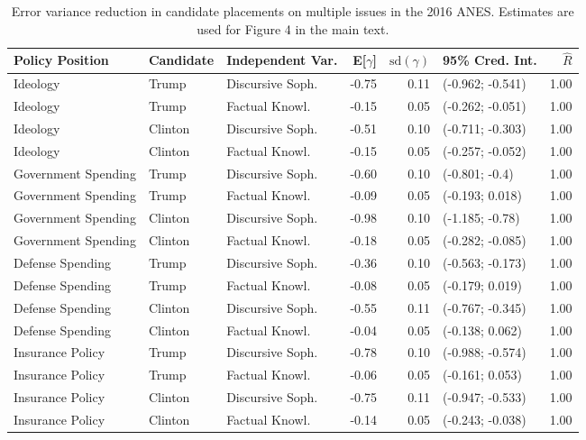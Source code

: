 \begin{table}[ht]
\centering
\caption{Error variance reduction in candidate placements on multiple issues in the 2016 ANES.
         Estimates are used for Figure 4 in the main text.} 
\label{app:hetreg2016}
\begin{tabular}{lllrrlr}
  \hline
Policy Position & Candidate & Independent Var. & E[$\gamma$] & $\text{sd}(\gamma)$ & 95\% Cred. Int. & $\hat{R}$ \\ 
  \hline
Ideology & Trump & Discursive Soph. & -0.75 & 0.11 & (-0.962; -0.541) & 1.00 \\ 
  Ideology & Trump & Factual Knowl. & -0.15 & 0.05 & (-0.262; -0.051) & 1.00 \\ 
  Ideology & Clinton & Discursive Soph. & -0.51 & 0.10 & (-0.711; -0.303) & 1.00 \\ 
  Ideology & Clinton & Factual Knowl. & -0.15 & 0.05 & (-0.257; -0.052) & 1.00 \\ 
  Government Spending & Trump & Discursive Soph. & -0.60 & 0.10 & (-0.801; -0.4) & 1.00 \\ 
  Government Spending & Trump & Factual Knowl. & -0.09 & 0.05 & (-0.193; 0.018) & 1.00 \\ 
  Government Spending & Clinton & Discursive Soph. & -0.98 & 0.10 & (-1.185; -0.78) & 1.00 \\ 
  Government Spending & Clinton & Factual Knowl. & -0.18 & 0.05 & (-0.282; -0.085) & 1.00 \\ 
  Defense Spending & Trump & Discursive Soph. & -0.36 & 0.10 & (-0.563; -0.173) & 1.00 \\ 
  Defense Spending & Trump & Factual Knowl. & -0.08 & 0.05 & (-0.179; 0.019) & 1.00 \\ 
  Defense Spending & Clinton & Discursive Soph. & -0.55 & 0.11 & (-0.767; -0.345) & 1.00 \\ 
  Defense Spending & Clinton & Factual Knowl. & -0.04 & 0.05 & (-0.138; 0.062) & 1.00 \\ 
  Insurance Policy & Trump & Discursive Soph. & -0.78 & 0.10 & (-0.988; -0.574) & 1.00 \\ 
  Insurance Policy & Trump & Factual Knowl. & -0.06 & 0.05 & (-0.161; 0.053) & 1.00 \\ 
  Insurance Policy & Clinton & Discursive Soph. & -0.75 & 0.11 & (-0.947; -0.533) & 1.00 \\ 
  Insurance Policy & Clinton & Factual Knowl. & -0.14 & 0.05 & (-0.243; -0.038) & 1.00 \\ 

\end{tabular}
\end{table}

